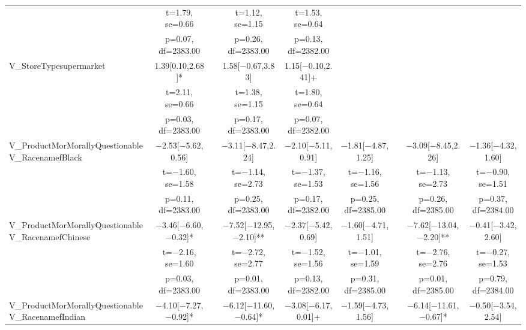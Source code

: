 \documentclass[]{report}
\begin{document}
\begin{table}
{\begin{tabular}[t]{lcccccccc}
			& t=\num{1.79}, se=\num{0.66} &  & t=\num{1.12}, se=\num{1.15} & t=\num{1.53}, se=\num{0.64} &  &  &  & \\
			& p=\num{0.07}, df=\num{2383.00} &  & p=\num{0.26}, df=\num{2383.00} & p=\num{0.13}, df=\num{2382.00} &  &  &  & \\
			V\_StoreTypesupermarket & \num{1.39}[\num{0.10},\num{2.68}]* &  & \num{1.58}[\num{-0.67},\num{3.83}] & \num{1.15}[\num{-0.10},\num{2.41}]+ &  &  &  & \\
			& t=\num{2.11}, se=\num{0.66} &  & t=\num{1.38}, se=\num{1.15} & t=\num{1.80}, se=\num{0.64} &  &  &  & \\
			& p=\num{0.03}, df=\num{2383.00} &  & p=\num{0.17}, df=\num{2383.00} & p=\num{0.07}, df=\num{2382.00} &  &  &  & \\
			V\_ProductMorMorallyQuestionableV\_RacenamefBlack & \num{-2.53}[\num{-5.62},\num{0.56}] &  & \num{-3.11}[\num{-8.47},\num{2.24}] & \num{-2.10}[\num{-5.11},\num{0.91}] & \num{-1.81}[\num{-4.87},\num{1.25}] &  & \num{-3.09}[\num{-8.45},\num{2.26}] & \num{-1.36}[\num{-4.32},\num{1.60}]\\
			& t=\num{-1.60}, se=\num{1.58} &  & t=\num{-1.14}, se=\num{2.73} & t=\num{-1.37}, se=\num{1.53} & t=\num{-1.16}, se=\num{1.56} &  & t=\num{-1.13}, se=\num{2.73} & t=\num{-0.90}, se=\num{1.51}\\
			& p=\num{0.11}, df=\num{2383.00} &  & p=\num{0.25}, df=\num{2383.00} & p=\num{0.17}, df=\num{2382.00} & p=\num{0.25}, df=\num{2385.00} &  & p=\num{0.26}, df=\num{2385.00} & p=\num{0.37}, df=\num{2384.00}\\
			V\_ProductMorMorallyQuestionableV\_RacenamefChinese & \num{-3.46}[\num{-6.60},\num{-0.32}]* &  & \num{-7.52}[\num{-12.95},\num{-2.10}]** & \num{-2.37}[\num{-5.42},\num{0.69}] & \num{-1.60}[\num{-4.71},\num{1.51}] &  & \num{-7.62}[\num{-13.04},\num{-2.20}]** & \num{-0.41}[\num{-3.42},\num{2.60}]\\
			& t=\num{-2.16}, se=\num{1.60} &  & t=\num{-2.72}, se=\num{2.77} & t=\num{-1.52}, se=\num{1.56} & t=\num{-1.01}, se=\num{1.59} &  & t=\num{-2.76}, se=\num{2.76} & t=\num{-0.27}, se=\num{1.53}\\
			& p=\num{0.03}, df=\num{2383.00} &  & p=\num{0.01}, df=\num{2383.00} & p=\num{0.13}, df=\num{2382.00} & p=\num{0.31}, df=\num{2385.00} &  & p=\num{0.01}, df=\num{2385.00} & p=\num{0.79}, df=\num{2384.00}\\
			V\_ProductMorMorallyQuestionableV\_RacenamefIndian & \num{-4.10}[\num{-7.27},\num{-0.92}]* &  & \num{-6.12}[\num{-11.60},\num{-0.64}]* & \num{-3.08}[\num{-6.17},\num{0.01}]+ & \num{-1.59}[\num{-4.73},\num{1.56}] &  & \num{-6.14}[\num{-11.61},\num{-0.67}]* & \num{-0.50}[\num{-3.54},\num{2.54}]\\

\end{tabular}}
\end{table}
\end{document}
